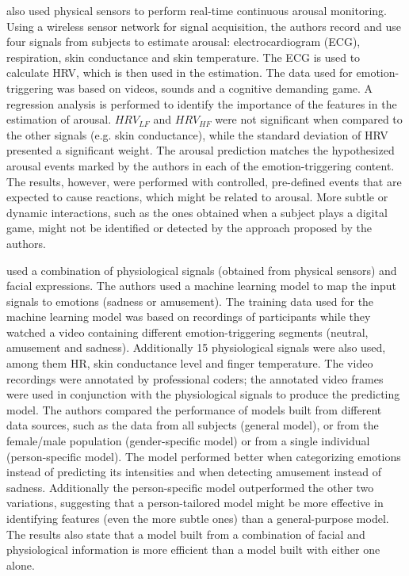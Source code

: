 \textcite{grundlehner2009design} also used physical sensors to perform real-time continuous arousal monitoring. Using a wireless sensor network for signal acquisition, the authors record and use four signals from subjects to estimate arousal: electrocardiogram (ECG), respiration, skin conductance and skin temperature. The ECG is used to calculate HRV, which is then used in the estimation. The data used for emotion-triggering was based on videos, sounds and a cognitive demanding game. A regression analysis is performed to identify the importance of the features in the estimation of arousal. $HRV_{LF}$ and $HRV_{HF}$ were not significant when compared to the other signals (e.g. skin conductance), while the standard deviation of HRV presented a significant weight. The arousal prediction matches the hypothesized arousal events marked by the authors in each of the emotion-triggering content. The results, however, were performed with controlled, pre-defined events that are expected to cause reactions, which might be related to arousal. More subtle or dynamic interactions, such as the ones obtained when a subject plays a digital game, might not be identified or detected by the approach proposed by the authors.

\parencite{bailenson2008real} used a combination of physiological signals (obtained from physical sensors) and facial expressions. The authors used a machine learning model to map the input signals to emotions (sadness or amusement). The training data used for the machine learning model was based on recordings of participants while they watched a video containing different emotion-triggering segments (neutral, amusement and sadness). Additionally 15 physiological signals were also used, among them HR, skin conductance level and finger temperature. The video recordings were annotated by professional coders; the annotated video frames were used in conjunction with the physiological signals to produce the predicting model. The authors compared the performance of models built from different data sources, such as the data from all subjects (general model), or from the female/male population (gender-specific model) or from a single individual (person-specific model). The model performed better when categorizing emotions instead of predicting its intensities and when detecting amusement instead of sadness. Additionally the person-specific model outperformed the other two variations, suggesting that a person-tailored model might be more effective in identifying features (even the more subtle ones) than a general-purpose model. The results also state that a model built from a combination of facial and physiological information is more efficient than a model built with either one alone.

